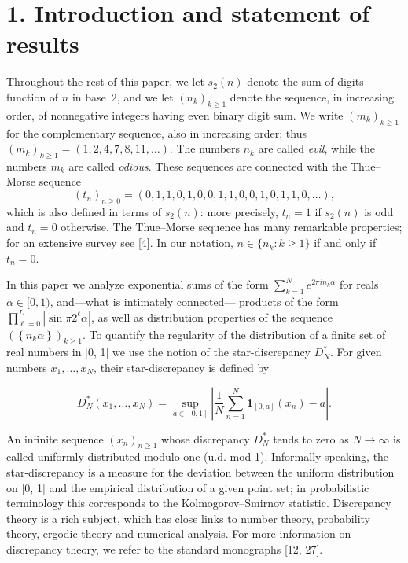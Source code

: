 \documentclass[10pt]{article}
\newcommand{\1}{\mathbf{1}}
\begin{document}
\section*{1. Introduction and statement of results}
Throughout the rest of this paper, we let $s_2(n)$ denote the sum-of-digits
function of $n$ in base~$2$, and we let $(n_k)_{k\geqslant1}$ denote the
sequence, in increasing order, of nonnegative integers having even binary
digit sum.  We write $(m_k)_{k\geqslant1}$ for the complementary sequence,
also in increasing order; thus
$(m_k)_{k\geqslant1}=(1,2,4,7,8,11,\ldots)$.  The numbers $n_k$ are called
\emph{evil}, while the numbers $m_k$ are called \emph{odious}.  These
sequences are connected with the Thue--Morse sequence
\[
(t_n)_{n\geqslant0}=(0,1,1,0,1,0,0,1,1,0,0,1,0,1,1,0,\ldots),
\]
which is also defined in terms of $s_2(n)$: more precisely, $t_n=1$ if
$s_2(n)$ is odd and $t_n=0$ otherwise.  The Thue--Morse sequence has many
remarkable properties; for an extensive survey see [4].  In our notation,
$n\in\{n_k:k\geqslant1\}$ if and only if $t_n=0$.

In this paper we analyze exponential sums of the form $\sum_{k=1}^{N} e^{2 \pi i n_{k} \alpha}$ for reals $\alpha \in[0,1)$, and---what is intimately connected--- products of the form $\prod_{\ell=0}^{L}\left|\sin \pi 2^{\ell} \alpha\right|$, as well as distribution properties of the sequence $\left(\left\{n_{k} \alpha\right\}\right)_{k \geqslant 1}$. To quantify the regularity of the distribution of a finite set of real numbers in [0, 1] we use the notion of the star-discrepancy $D_{N}^{*}$. For given numbers $x_{1}, \ldots, x_{N}$, their star-discrepancy is defined by

$$
D_{N}^{*}\left(x_{1}, \ldots, x_{N}\right)=\sup _{a \in[0,1]}\left|\frac{1}{N} \sum_{n=1}^{N} \mathbf{1}_{[0, a]}\left(x_{n}\right)-a\right| .
$$

An infinite sequence $\left(x_{n}\right)_{n \geqslant 1}$ whose discrepancy $D_{N}^{*}$ tends to zero as $N\rightarrow\infty$ is called uniformly distributed modulo one (u.d. mod 1). Informally speaking, the star-discrepancy is a measure for the deviation between the uniform distribution on [0, 1] and the empirical distribution of a given point set; in probabilistic terminology this corresponds to the Kolmogorov--Smirnov statistic. Discrepancy theory is a rich subject, which has close links to number theory, probability theory, ergodic theory and numerical analysis. For more information on discrepancy theory, we refer to the standard monographs [12, 27].
\end{document}
